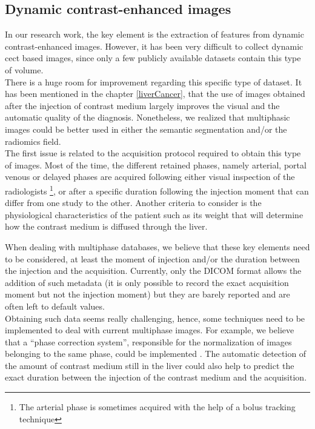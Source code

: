\subsection*{Dynamic contrast-enhanced images}
\label{subsec:DCE}

In our research work, the key element is the extraction of features
from dynamic contrast-enhanced images. However, it has been very
difficult to collect dynamic \ac{cect} based images, since only a few
publicly available datasets contain this type of volume. \\
There is a huge room for improvement regarding this specific type of
dataset. It has been mentioned in the chapter \ref{liverCancer}, that the
use of images obtained after the injection of contrast medium largely
improves the visual and the automatic quality of the diagnosis.
Nonetheless, we realized that multiphasic images could be better used in
either the semantic segmentation and/or the radiomics field.\\
The first issue is related to the acquisition protocol required to
obtain this type of images. Most of the time, the different retained
phases, namely arterial, portal venous or delayed phases are acquired
following either visual inspection of the radiologists \footnote{The arterial phase is sometimes acquired
with the help of a bolus tracking technique}, or after a specific
duration following the injection moment that can differ from one study
to the other. Another criteria to consider is the physiological
characteristics of the patient such as its weight that will determine
how the contrast medium is diffused through the liver.

When dealing with multiphase databases, we believe that these key
elements need to be considered, at least the moment of injection and/or
the duration between the injection and the acquisition.  
Currently, only the DICOM
format allows the addition of such metadata (it is only possible to record 
the exact acquisition moment but not the injection moment) 
but they are barely reported and
are often left to default values.\\
Obtaining such data seems really challenging, hence, some techniques
need to be implemented to deal with current multiphase images. 
For example, we believe that a ``phase correction system'', responsible for 
the normalization of images belonging to the same phase, could be
implemented . The automatic detection of the amount of contrast medium still in
the liver could also help to predict the exact duration between the
injection of the contrast medium and the acquisition.

